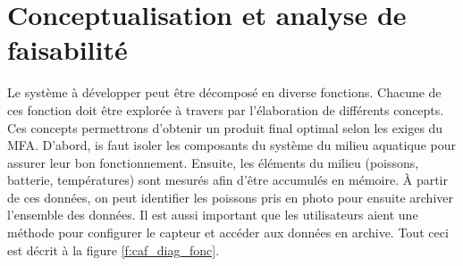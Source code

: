 

\chapter{Conceptualisation et analyse de faisabilité}
\label{s:concpt_anals}



\pagebreak
Le système à développer peut être décomposé en diverse fonctions. Chacune de ces fonction doit être explorée à travers par l'élaboration de différents concepts. Ces concepts permettrons d'obtenir un produit final optimal selon les exiges du MFA. D'abord, is faut isoler les composants du système du milieu aquatique pour assurer leur bon fonctionnement. Ensuite, les éléments du milieu (poissons, batterie, températures) sont mesurés afin d'être accumulés en mémoire. À partir de ces données, on peut identifier les poissons pris en photo pour ensuite archiver l'ensemble des données. Il est aussi important que les utilisateurs aient une méthode pour configurer le capteur et accéder aux données en archive. Tout ceci est décrit à la figure \ref{f:caf_diag_fonc}.









